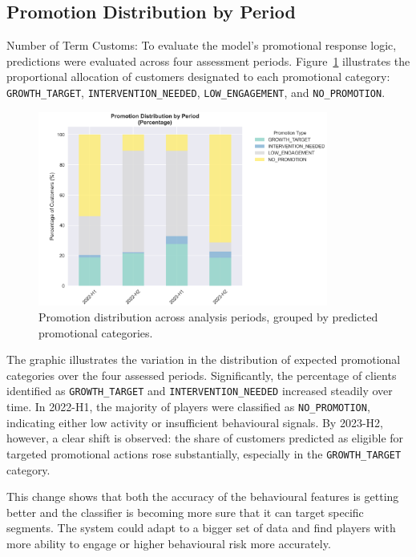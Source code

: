 \documentclass[12pt,a4paper]{report}
\begin{document}
\subsection{Promotion Distribution by Period}
\label{sec:promotion_distribution}

Number of Term Customs: To evaluate the model's promotional response logic, predictions were evaluated across four assessment periods. Figure~\ref{fig:promotion-distribution} illustrates the proportional allocation of customers designated to each promotional category: \texttt{GROWTH\_TARGET}, \texttt{INTERVENTION\_NEEDED}, \texttt{LOW\_ENGAGEMENT}, and \texttt{NO\_PROMOTION}.

\begin{figure}[H]
\centering
\includegraphics[width=0.85\textwidth]{figures/promotion_distribution_by_period.png}
\caption{Promotion distribution across analysis periods, grouped by predicted promotional categories.}
\label{fig:promotion-distribution}
\end{figure}

The graphic illustrates the variation in the distribution of expected promotional categories over the four assessed periods. Significantly, the percentage of clients identified as \texttt{GROWTH\_TARGET} and \texttt{INTERVENTION\_NEEDED} increased steadily over time. In 2022-H1, the majority of players were classified as \texttt{NO\_PROMOTION}, indicating either low activity or insufficient behavioural signals. By 2023-H2, however, a clear shift is observed: the share of customers predicted as eligible for targeted promotional actions rose substantially, especially in the \texttt{GROWTH\_TARGET} category.

This change shows that both the accuracy of the behavioural features is getting better and the classifier is becoming more sure that it can target specific segments.  The system could adapt to a bigger set of data and find players with more ability to engage or higher behavioural risk more accurately.
\end{document}
